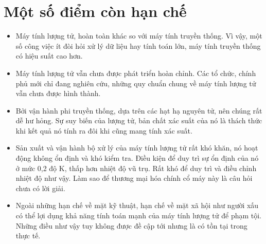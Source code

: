 \section{Một số điểm còn hạn chế}
\begin{itemize}
    \item Máy tính lượng tử, hoàn toàn khác so với máy tính truyền thống. Vì vậy, một số công việc ít đòi hỏi xử lý dữ liệu hay tính toán lớn, máy tính truyền thống có hiệu suất cao hơn.
    \item Máy tính lượng tử vẫn chưa được phát triển hoàn chỉnh. Các tổ chức, chính phủ mới chỉ đang nghiên cứu, những quy chuẩn chung về máy tính lượng tử vẫn chưa được hình thành.
    \item Bởi vận hành phi truyền thống, dựa trên các hạt hạ nguyên tử, nên chúng rất dễ hư hỏng. Sự suy biến của lượng tử, bản chất xác suất của nó là thách thức khi kết quả nó tính ra đôi khi cũng mang tính xác suất.
    \item Sản xuất và vận hành bộ xử lý của máy tính lượng tử rất khó khăn, nó hoạt động không ổn định và khó kiểm tra. Điều kiện để duy trì sự ổn định của nó ở mức 0,2 độ K, thấp hơn nhiệt độ vũ trụ. Rất khó để duy trì và điều chỉnh nhiệt độ như vậy. Làm sao để thương mại hóa chính cổ máy này là câu hỏi chưa có lời giải.
    \item Ngoài những hạn chế về mặt kỹ thuật, hạn chế về mặt xã hội như người xấu có thể lợi dụng khả năng tính toán mạnh của máy tính lượng tử để phạm tội. Những điều như vậy tuy không được đề cập tới nhưng là có tồn tại trong thực tế.
\end{itemize}
